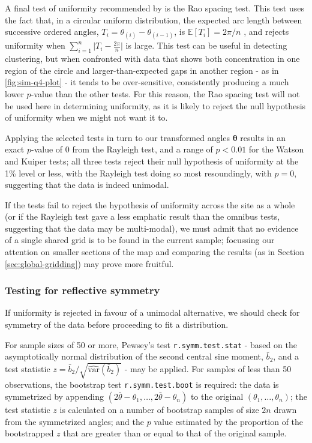 \documentclass[../../ArchStats.tex]{subfiles}
\begin{document}
A final test of uniformity recommended by \cite{Pewsey2014} is the Rao spacing test. This test uses the fact that, in a circular uniform distribution, the expected arc length between successive ordered angles, $T_i = \theta_{(i)} - \theta_{(i-1)}$, is 
$\mathbb{E}\left[T_i\right] = 2\pi/n$ , and rejects uniformity when $\sum_{i=1}^n \vert T_i - \frac{2\pi}{n}\vert$ is large. This test can be useful in detecting clustering, but when confronted with data that shows both concentration in one region of the circle and larger-than-expected gaps in another region - as in \ref{fig:sim-q4-plot} - it tends to be over-sensitive, consistently producing a much lower $p$-value than the other tests. For this reason, the Rao spacing test will not be used here in determining uniformity, as it is likely to reject the null hypothesis of uniformity when we might not want it to. 

Applying the selected tests in turn to our transformed angles $\mathbf{\theta}$ results in an exact $p$-value of 0 from the Rayleigh test, and a range of $p < 0.01$ for the Watson and Kuiper tests; all three tests reject their null hypothesis of uniformity at the 1\% level or less, with the Rayleigh test doing so most resoundingly, with $p=0$, suggesting that the data is indeed unimodal. 

If the tests fail to reject the hypothesis of uniformity across the site as a whole (or if the Rayleigh test gave a less emphatic result than the omnibus tests, suggesting that the data may be multi-modal), we must admit that no evidence of a single shared grid is to be found in the current sample; focussing our attention on smaller sections of the map and comparing the results (as in Section \ref{sec:global-gridding}) may prove more fruitful. 


\subsubsection{Testing for reflective symmetry}
If uniformity is rejected in favour of a unimodal alternative, we should check for symmetry of the data before proceeding to fit a distribution. 

For sample sizes of 50 or more, Pewsey's test \texttt{r.symm.test.stat} - based on the asymptotically normal distribution of the second central sine moment, $\bar{b}_2$, and a test statistic $z = \bar{b}_2 / \sqrt{\widehat{\text{var}}(\bar{b}_2)}$ \cite{Pewsey2002} - may be applied. For samples of less than 50 observations, the bootstrap test \texttt{r.symm.test.boot} is required: the data is symmetrized by appending $(2\bar{\theta} - \theta_1, \dots, 2\bar{\theta} - \theta_n)$ to the original $(\theta_1, \dots, \theta_n)$; the test statistic $z$ is calculated on a number of bootstrap samples of size $2n$ drawn from the symmetrized angles; and the $p$ value estimated by the proportion of the bootstrapped $z$ that are greater than or equal to that of the original sample.
\end{document}
